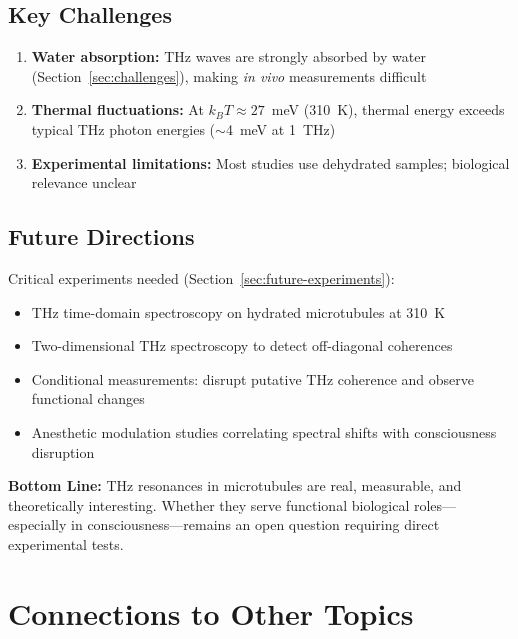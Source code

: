 \subsection{Key Challenges}

\begin{enumerate}
\item \textbf{Water absorption:} THz waves are strongly absorbed by water (Section~\ref{sec:challenges}), making \textit{in vivo} measurements difficult
\item \textbf{Thermal fluctuations:} At $k_B T \approx 27$~meV (310~K), thermal energy exceeds typical THz photon energies ($\sim$4~meV at 1~THz)
\item \textbf{Experimental limitations:} Most studies use dehydrated samples; biological relevance unclear
\end{enumerate}

\subsection{Future Directions}

Critical experiments needed (Section~\ref{sec:future-experiments}):
\begin{itemize}
\item THz time-domain spectroscopy on hydrated microtubules at 310~K
\item Two-dimensional THz spectroscopy to detect off-diagonal coherences
\item Conditional measurements: disrupt putative THz coherence and observe functional changes
\item Anesthetic modulation studies correlating spectral shifts with consciousness disruption
\end{itemize}

\begin{keyconcept}
\textbf{Bottom Line:} THz resonances in microtubules are real, measurable, and theoretically interesting. Whether they serve functional biological roles---especially in consciousness---remains an open question requiring direct experimental tests.
\end{keyconcept}

\section{Connections to Other Topics}\label{connections-to-other-wiki-pages}

